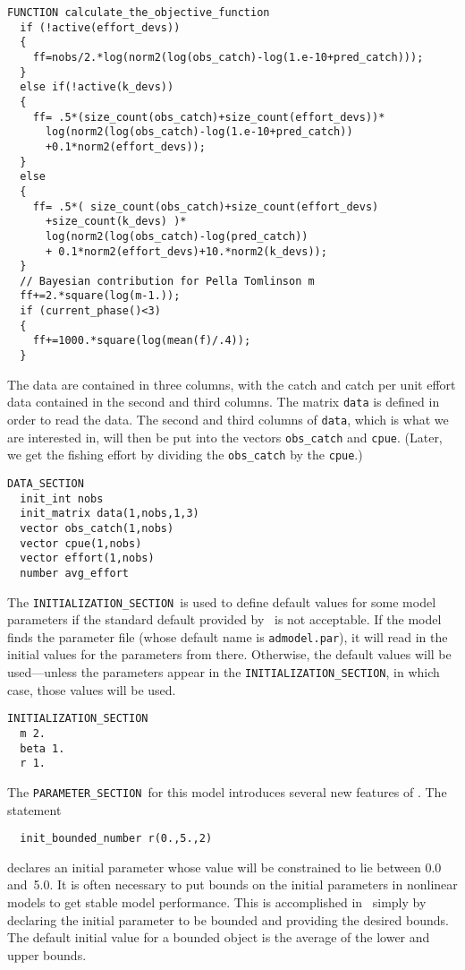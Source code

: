 \documentclass{admbmanual}
\newcommand\PS{\texttt{PARAMETER\_SECTION}}
\newcommand\IS{\texttt{INITIALIZATION\_SECTION}}
\begin{document}
\begin{lstlisting}
FUNCTION calculate_the_objective_function
  if (!active(effort_devs))
  {
    ff=nobs/2.*log(norm2(log(obs_catch)-log(1.e-10+pred_catch)));
  }
  else if(!active(k_devs))
  {
    ff= .5*(size_count(obs_catch)+size_count(effort_devs))*
      log(norm2(log(obs_catch)-log(1.e-10+pred_catch))
      +0.1*norm2(effort_devs));
  }
  else
  {
    ff= .5*( size_count(obs_catch)+size_count(effort_devs)
      +size_count(k_devs) )*
      log(norm2(log(obs_catch)-log(pred_catch))
      + 0.1*norm2(effort_devs)+10.*norm2(k_devs));
  }
  // Bayesian contribution for Pella Tomlinson m
  ff+=2.*square(log(m-1.));
  if (current_phase()<3)
  {
    ff+=1000.*square(log(mean(f)/.4));
  }
\end{lstlisting}
The data are contained in three columns, with the catch and catch per unit
effort data contained in the second and third columns. The matrix \texttt{data}
is defined in order to read the data. The second and third columns of
\texttt{data}, which is what we are interested in, will then be put into the
vectors \texttt{obs\_catch} and \texttt{cpue}. (Later, we get the fishing effort
by dividing the \texttt{obs\_catch} by the \texttt{cpue}.)
\begin{lstlisting}
DATA_SECTION
  init_int nobs
  init_matrix data(1,nobs,1,3)
  vector obs_catch(1,nobs)
  vector cpue(1,nobs)
  vector effort(1,nobs)
  number avg_effort
\end{lstlisting}
The \IS\ is used to define default values for some model parameters if the
standard default provided by \ADM\ is not acceptable. If the model finds the
parameter file (whose default name is \texttt{admodel.par}), it will read in the
initial values for the parameters from there. Otherwise, the default values will
be used---unless the parameters appear in the \IS, in which case, those values
will be used.
\begin{lstlisting}
INITIALIZATION_SECTION
  m 2.
  beta 1.
  r 1.
\end{lstlisting}
The \PS\ for this model introduces several new features of \ADM. The statement
\begin{lstlisting}
  init_bounded_number r(0.,5.,2)
\end{lstlisting}
declares an initial parameter whose value will be constrained to lie between 0.0
and~5.0. It is often necessary to put bounds on the initial parameters in
nonlinear models to get stable model performance. This is accomplished in \ADM\
simply by declaring the initial parameter to be bounded and providing the
desired bounds. The default initial value for a bounded object is the average of
the lower and upper bounds.
\end{document}
